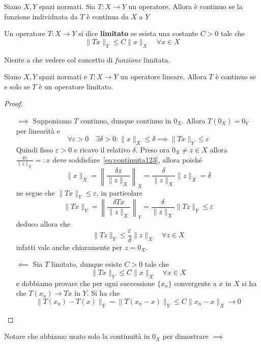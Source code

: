 \begin{definition}
    Siano \(X, Y\) spazi normati. Sia \(T : X \to Y\) un operatore. Allora è
    continuo se la funzione individuata da \(T\) è continua da \(X\) a \(Y\) 
\end{definition}
\begin{definition}
    Un operatore \(T : X \to Y\) si dice \textbf{limitato} se esista una
    costante \(C > 0\) tale che
    \[
      \|Tx\|_Y \le C\|x\|_X \quad \forall x \in X
    \]
\end{definition}
\begin{remark}
    Niente a che vedere col concetto di \emph{funzione} limitata. 
\end{remark}
\begin{theorem}
    Siano \(X, Y\) spazi normati e \(T : X \to Y\) un operatore lineare. Allora
    \(T\) è continuo se e solo se \(T\) è un operatore limitato.
\end{theorem}
\begin{proof}\( \)
\begin{itemize}
    \item[\(\implies \)] Supponiamo \(T\) continuo, dunque continuo in \(0_X\).
        Allora \(T{(0_X)} = 0_Y\) per linearità e
        \begin{equation}\label{eq:continuita123}
          \forall \varepsilon > 0 \quad \exists \delta > 0 : \|x\|_X \le  \delta
          \implies \|Tx\|_Y \le  \varepsilon
        \end{equation}
        Quindi fisso \(\varepsilon>0\) e ricavo il relativo \(\delta\). Preso ora \(0_X \neq z \in X\) allora \(\displaystyle \frac{\delta
        z}{\|z\|_X} =: x\) deve soddisfare~\ref{eq:continuita123}, allora poiché
        \[
            \|x\|_X = \left\| \frac{\delta z}{\|z\|_X} \right\|_X =
            \frac{\delta}{\|z\|_X} \|z\|_X = \delta
        \]
        ne segue che \(\|Tx\|_Y \le \varepsilon\), in particolare
        \[
            \|Tx\|_Y = \left\| \frac{\delta Tx}{\|z\|_X} \right\|_Y =
            \frac{\delta}{\|z\|_X} \|Tz\|_Y \le \varepsilon
        \]
        deduco allora che 
        \[
          \|Tz\|_Y \le \frac{\varepsilon}{\delta} \|z\|_X \quad \forall z \in X
        \]
        infatti vale anche chiaramente per \(z = 0_X\).
    \item[\(\impliedby \)] Sia \(T\) limitato, dunque esiste \(C > 0\) tale che 
        \[
          \| Tx\|_Y \le C \|x\|_X \quad \forall x \in X
        \]
        e dobbiamo provare che per ogni successione \(\{x_{n}\} \) convergente a
        \(x\) in \(X\)  si ha che \(T{(x_{n})} \to Tx\) in \(Y\). Si ha che
        \[
            \|T{(x_{n})} - T{(x)}\|_Y = \|T{(x_{n} - x)}\|_Y \le C \|x_{n} -
            x\|_X \to 0
        \]
\end{itemize}
\end{proof}
\begin{note}
    Notare che abbiamo usato solo la continuità in \(0_X\) per dimostrare \(\implies\) 
\end{note}

